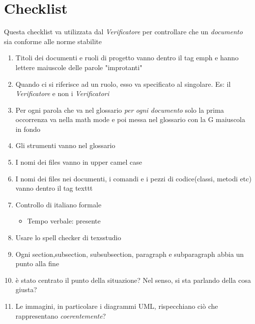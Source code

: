 \section{Checklist}
Questa checklist va utilizzata dal \emph{Verificatore} per controllare che un \emph{documento} sia conforme alle norme stabilite

\begin{enumerate}
	\item Titoli dei documenti e ruoli di progetto vanno dentro il tag emph e hanno lettere maiuscole delle parole "improtanti"
	\item Quando ci si riferisce ad un ruolo, esso va specificato al singolare. Es: il \emph{Verificatore} e non i \emph{Verificatori}
	\item Per ogni parola che va nel glossario \emph{per ogni documento} solo la prima occorrenza va nella math mode e poi messa nel glossario con la G maiuscola in fondo
	\item Gli strumenti vanno nel glossario
	\item I nomi dei files vanno in upper camel case
	\item I nomi dei files nei documenti, i comandi e i pezzi di codice(classi, metodi etc) vanno dentro il tag texttt
	\item Controllo di italiano formale
	\begin{itemize}
		\item Tempo verbale: presente
	\end{itemize}
	\item Usare lo spell checker di texsstudio
	\item Ogni section,subsection, subsubsection, paragraph e subparagraph abbia un punto alla fine
	\item è stato centrato il punto della situazione? Nel senso, si sta parlando della cosa giusta?
	\item Le immagini, in particolare i diagrammi UML, rispecchiano ciò che rappresentano \emph{coerentemente}?
\end{enumerate}